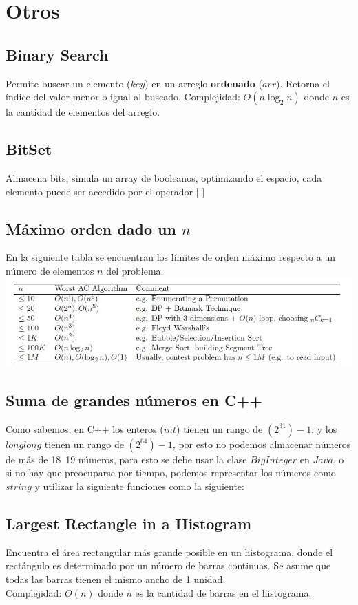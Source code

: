 \documentclass[10pt,letterpaper,twocolumn]{article}
\newcommand{\source}[1]{
	
	\dotfill
}
\begin{document}
\section{Otros}
	\subsection{Binary Search}
		Permite buscar un elemento ($key$) en un arreglo \textbf{ordenado} ($arr$). Retorna el índice del valor menor o igual al buscado.
		Complejidad: $O(n \log_2 n)$ donde $n$ es la cantidad de elementos del arreglo.\\
		\source{./src/binarySearch.cpp}
	\subsection{BitSet}
		Almacena bits, simula un array de booleanos, optimizando el espacio, cada elemento puede ser accedido por el operador $[$ $]$\\
		\source{./src/bitset.cpp}
	\subsection{Máximo orden dado un $n$}
		En la siguiente tabla se encuentran los límites de orden máximo respecto a un número de elementos $n$ del problema.\\
		\includegraphics[scale=0.5]{./src/maxorder.jpg}
	\subsection{Suma de grandes números en C++}
		Como sabemos, en C++ los enteros ($int$) tienen un rango de $(2^31)-1$, y los $long long$ tienen un rango de $(2^64)-1$, por esto no podemos almacenar números de más de 18~19 números, para esto se debe usar la clase $BigInteger$ en $Java$, o si no hay que preocuparse por tiempo, podemos representar los números como $string$ y utilizar la siguiente funciones como la siguiente:
		\source{./src/bigIntegerCpp.cpp}
	\subsection{Largest Rectangle in a Histogram}
		Encuentra el área rectangular más grande posible en un histograma, donde el rectángulo es determinado por un número de barras continuas. Se asume que todas las barras tienen el mismo ancho de 1 unidad. \\
		Complejidad: $O(n)$ donde $n$ es la cantidad de barras en el histograma.
		\source{./src/largest_rectangle.cpp}
		
\end{document}
